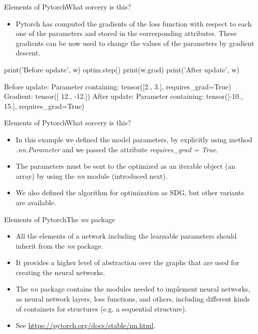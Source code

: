 \documentclass{beamer}
\begin{document}
\begin{frame}[fragile]{Elements of Pytorch}{What sorcery is this?}
\begin{itemize}
    \item Pytorch has computed the gradients of the loss function with respect to each one of the parameters and stored in the corresponding attributes. These gradients can be now used to change the values of the parameters by gradient descent.  
\end{itemize}
\begin{python}
print('Before update', w)
optim.step()
print(w.grad)
print('After update', w)
\end{python}
\begin{python}
Before update: Parameter containing:
tensor([2., 3.], requires_grad=True)
Gradient: tensor([ 12., -12.])
After update: Parameter containing:
tensor([-10.,  15.], requires_grad=True)
\end{python}
\end{frame}
\begin{frame}{Elements of Pytorch}{What sorcery is this?}
\begin{itemize}
    \item In this example we defined the model parameters, by explicitly using method \emph{.nn.Parameter} and we passed the attribute \emph{requires\_grad = True}. 
    \item The parameters must be sent to the optimized as an iterable object (an array) by using the  \emph{nn} module (introduced next).
    \item We also defined the algorithm for optimization as SDG, but other variants are available. 
\end{itemize}
\end{frame}



\begin{frame}[fragile]{Elements of Pytorch}{The \emph{nn} package}
\begin{itemize}
    
    \item All the elements of a network including the learnable parameters should inherit from the \emph{nn} package.

    
    \item It provides a higher level of abstraction over the graphs that are used for creating the neural networks.
    
   \item The \emph{nn} package contains the modules needed to implement neural networks, as neural network layers, loss functions, and others, including different kinds of containers for structures (e.g. a sequential structure).    

   \item See  \href{https://pytorch.org/docs/stable/nn.html}{https://pytorch.org/docs/stable/nn.html}.

\end{itemize}

\end{frame}
\end{document}
